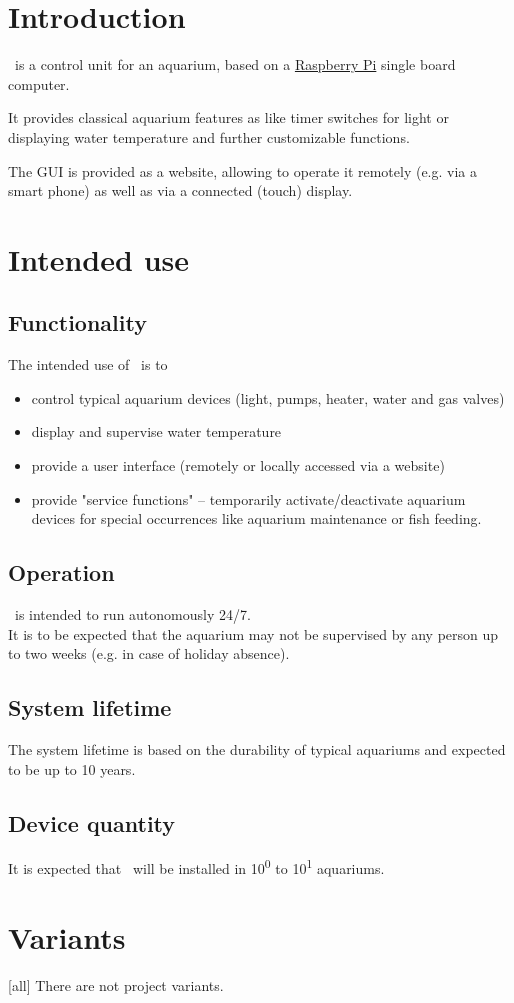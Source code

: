 \documentclass{../../git_submodules/common_docu/doc_class}
\author{\defaultAuthor}
\date{2019-04-04}
\begin{document}
  
  \section{Introduction}
  \ThisProjectName~is a control unit for an aquarium, based on a \hyperref{https://de.wikipedia.org/wiki/Raspberry_Pi}{}{}{Raspberry Pi} single board computer.
  
  It provides classical aquarium features as like timer switches for light or displaying water temperature and further customizable functions.
  
  The GUI is provided as a website, allowing to operate it remotely (e.g. via a smart phone) as well as via a connected (touch) display.
  
  \section{Intended use}
  \subsection{Functionality}
  The intended use of \ThisProjectName~is to 
  \begin{itemize}
    \item control typical aquarium  devices (light, pumps, heater, water and gas valves)
    \item display and supervise water temperature
    \item provide a user interface (remotely or locally accessed via a website)
    \item provide "service functions" -- temporarily activate/deactivate aquarium devices for special occurrences like aquarium maintenance or fish feeding.
  \end{itemize}

  \subsection{Operation}
  \ThisProjectName~is intended to run autonomously 24/7.\\
  It is to be expected that the aquarium may not be supervised by any person up to two weeks (e.g. in case of holiday absence).

  \subsection{System lifetime}
  The system lifetime is based on the durability of typical aquariums and expected to be up to 10 years.
  
  \subsection{Device quantity}
  It is expected that \ThisProjectName~will be installed in 10\textsuperscript{0} to 10\textsuperscript{1} aquariums.
  
  \section{Variants}[all]\label{variant:all}  
  There are not project variants.
  
\end{document}

